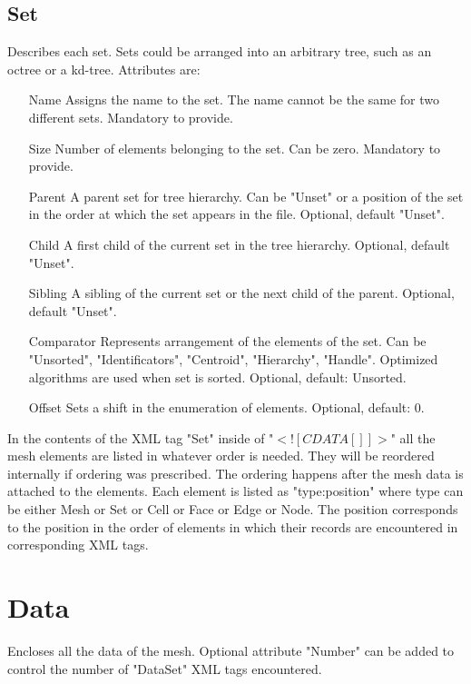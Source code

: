 \documentclass[14pt]{article}
\begin{document}
\subsection{Set}
Describes each set. Sets could be arranged into an arbitrary tree, such as an octree or a kd-tree. Attributes are:
\begin{itemize}
\item[Name] Assigns the name to the set. The name cannot be the same for two different sets. Mandatory to provide.
\item[Size] Number of elements belonging to the set. Can be zero. Mandatory to provide.
\item [Parent] A parent set for tree hierarchy. Can be "Unset" or a position of the set in the order at which the set appears in the file. Optional, default "Unset".
\item [Child] A first child of the current set in the tree hierarchy. Optional, default "Unset".
\item [Sibling] A sibling of the current set or the next child of the parent.  Optional, default "Unset".
\item [Comparator] Represents arrangement of the elements of the set. Can be "Unsorted", "Identificators", "Centroid", "Hierarchy", "Handle". Optimized algorithms are used when set is sorted. Optional, default: Unsorted.
\item [Offset] Sets a shift in the enumeration of elements. Optional, default: 0.
\end{itemize}
In the contents of the XML tag "Set" inside of  "$<![CDATA[]]>$" all the mesh elements are listed in whatever order is needed. They will be reordered internally if ordering was prescribed. The ordering happens after the mesh data is attached to the elements. Each element is listed as "type:position" where type can be either Mesh or Set or Cell or Face or Edge or Node. The position corresponds to the position in the order of elements in which their records are encountered in corresponding XML tags.
\section{Data}
Encloses all the data of the mesh. Optional attribute "Number" can be added to control the number of "DataSet" XML tags encountered.
\end{document}
